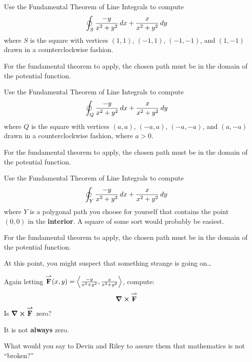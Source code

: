 \documentclass[noauthor,nooutcomes]{ximera}
\begin{document}
\begin{problem}
  Use the Fundamental Theorem of Line Integrals to compute
  \[
  \oint_S \frac{-y}{x^2+y^2}\mathop{}\!d x + \frac{x}{x^2+y^2}\mathop{}\!d y
  \]
  where $S$ is the square with vertices $(1,1)$, $(-1,1)$, $(-1,-1)$,
  and $(1,-1)$ drawn in a counterclockwise fashion.
  \begin{hint}
    For the fundamental theorem to apply, the chosen path must be in
    the domain of the potential function.
  \end{hint}
\end{problem}

\begin{problem}
  Use the Fundamental Theorem of Line Integrals to compute
  \[
  \oint_Q \frac{-y}{x^2+y^2}\mathop{}\!d x + \frac{x}{x^2+y^2}\mathop{}\!d y
  \]
  where $Q$ is the square with vertices $(a,a)$, $(-a,a)$, $(-a,-a)$,
  and $(a,-a)$ drawn in a counterclockwise fashion, where $a>0$.
  \begin{hint}
    For the fundamental theorem to apply, the chosen path must be in
    the domain of the potential function.
  \end{hint}
\end{problem}

\begin{problem}
  Use the Fundamental Theorem of Line Integrals to compute
  \[
  \oint_Y \frac{-y}{x^2+y^2}\mathop{}\!d x + \frac{x}{x^2+y^2}\mathop{}\!d y
  \]
  where $Y$ is a polygonal path you choose for yourself that contains
  the point $(0,0)$ in the \textbf{interior}. A square of some sort
  would probably be easiest.
  \begin{hint}
    For the fundamental theorem to apply, the chosen path must be in
    the domain of the potential function.
  \end{hint}
\end{problem}

At this point, you might suspect that something strange is going
on\dots

\begin{problem}
  Again letting ${\overset{\boldsymbol{\rightharpoonup}}{\mathbf{F}}}(x,y) =
  \left\langle \frac{-y}{x^2+y^2},\frac{x}{x^2+y^2}\right\rangle$, compute:
  \[
  \boldsymbol\nabla\boldsymbol\times {\overset{\boldsymbol{\rightharpoonup}}{\mathbf{F}}}
  \]
  Is $\boldsymbol\nabla\boldsymbol\times {\overset{\boldsymbol{\rightharpoonup}}{\mathbf{F}}}$ zero?
  \begin{hint}
    It is not \textbf{always} zero.
  \end{hint}
\end{problem}

\begin{problem}
  What would you say to Devin and Riley to assure them that
  mathematics is not ``broken?''
\end{problem}
\end{document}
